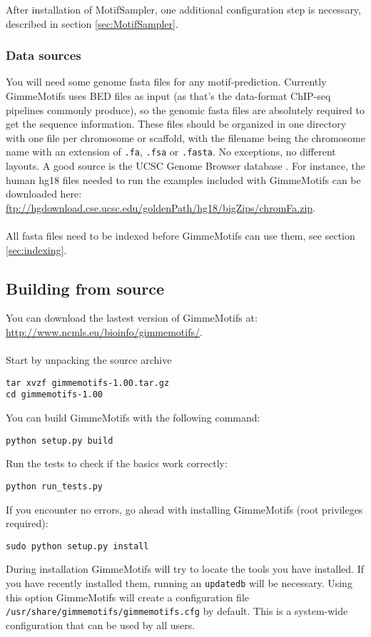 \documentclass[10pt]{article}
\begin{document}
After installation of MotifSampler, one additional configuration step is necessary, described in section \ref{sec:MotifSampler}.

\subsubsection{Data sources}
You will need some genome fasta files for any motif-prediction. Currently GimmeMotifs uses BED files as input (as that's the data-format ChIP-seq pipelines commonly produce), so the genomic fasta files are absolutely required to get the sequence information. These files should be organized in one directory with one file per chromosome or scaffold, with the filename being the chromosome name with an extension of \texttt{.fa}, \texttt{.fsa} or \texttt{.fasta}. No exceptions, no different layouts. A good source is the UCSC Genome Browser database \cite{rhead_ucsc_2010}. For instance, the human hg18 files needed to run the examples included with GimmeMotifs can be downloaded here:\\
\url{ftp://hgdownload.cse.ucsc.edu/goldenPath/hg18/bigZips/chromFa.zip}.\\
\\
All fasta files need to be indexed before GimmeMotifs can use them, see section \ref{sec:indexing}.

\subsection{Building from source}
You can download the lastest version of GimmeMotifs at:\\
\url{http://www.ncmls.eu/bioinfo/gimmemotifs/}. \\
\\
Start by unpacking the source archive
\begin{verbatim}
tar xvzf gimmemotifs-1.00.tar.gz
cd gimmemotifs-1.00
\end{verbatim}
You can build GimmeMotifs with the following command:
\begin{verbatim}
python setup.py build
\end{verbatim}
Run the tests to check if the basics work correctly:
\begin{verbatim}
python run_tests.py
\end{verbatim}
If you encounter no errors, go ahead with installing GimmeMotifs (root privileges required):
\begin{verbatim}
sudo python setup.py install
\end{verbatim}
During installation GimmeMotifs will try to locate the tools you have installed. If you have recently installed them, running an \texttt{updatedb} will be necessary. Using this option GimmeMotifs will create a configuration file \texttt{/usr/share/gimmemotifs/gimmemotifs.cfg} by default. This is a system-wide configuration that can be used by all users. 
\end{document}
